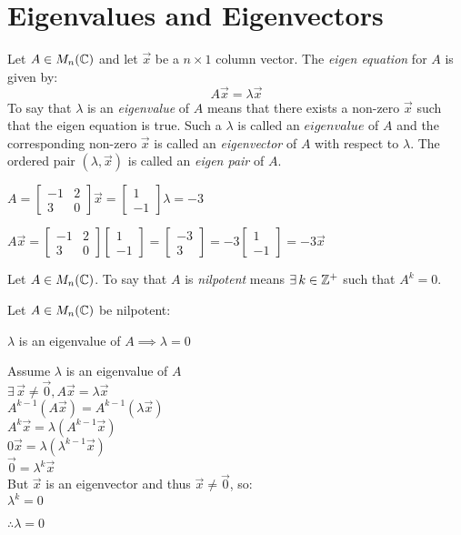 \documentclass[letterpaper,12pt,fleqn]{article}
\newcommand{\vx}{\vec{x}}
\newcommand{\vz}{\vec{0}}
\renewcommand{\l}{\lambda}
\newcommand{\hs}{\hspace{4ex}}
\begin{document}
\section*{Eigenvalues and Eigenvectors}

\begin{definition}
  Let $A\in M_n(\mathbb{C})$ and let $\vx$ be a $n\times 1$ column vector. The
  \emph{eigen equation} for $A$ is given by:
  \[A\vx=\l\vx\]
  To say that $\l$ is an \emph{eigenvalue} of $A$ means that there exists a
  non-zero $\vx$ such that the eigen equation is true. Such a $\l$ is called
  an $eigenvalue$ of $A$ and the corresponding non-zero $\vx$ is called an
  \emph{eigenvector} of $A$ with respect to $\l$. The ordered pair $(\l,\vx)$
  is called an \emph{eigen pair} of $A$.
\end{definition}

\renewcommand{\AA}{\begin{bmatrix} -1 & 2 \\ 3 & 0 \end{bmatrix}}
\newcommand{\xa}{\begin{bmatrix} 1 \\ -1 \end{bmatrix}}

\begin{example}
  $A=\AA$\hs$\vx=\xa$\hs$\l=-3$

  $A\vx=\AA\xa=\begin{bmatrix} -3 \\ 3 \end{bmatrix}=-3\xa=-3\vx$
\end{example}

\begin{definition}
  Let $A\in M_n(\mathbb{C})$. To say that $A$ is \emph{nilpotent} means
  $\exists\,k\in\mathbb{Z}^+$ such that $A^k=0$.
\end{definition}

\begin{theorem}
  Let $A\in M_n(\mathbb{C})$ be nilpotent:

  $\l$ is an eigenvalue of $A\implies\l=0$
\end{theorem}

\begin{theproof}
  Assume $\l$ is an eigenvalue of $A$ \\
  $\exists\,\vx\ne\vz,A\vx=\l\vx$ \\
  $A^{k-1}(A\vx)=A^{k-1}(\l\vx)$ \\
  $A^k\vx=\l(A^{k-1}\vx)$ \\
  $0\vx=\l(\l^{k-1}\vx)$ \\
  $\vz=\l^k\vx$ \\
  But $\vx$ is an eigenvector and thus $\vx\ne\vz$, so: \\
  $\l^k=0$

  $\therefore \l=0$
\end{theproof}
\end{document}
